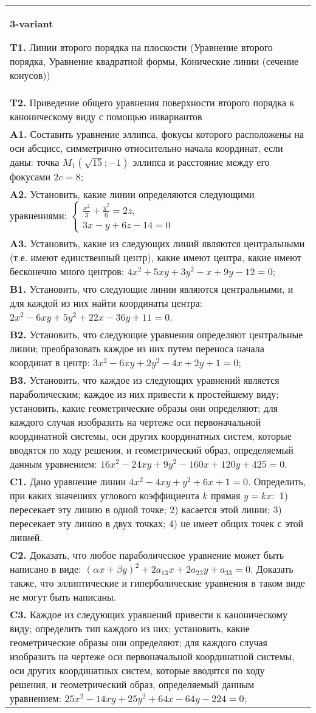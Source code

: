 \documentclass{article}
\begin{document}
\begin{tabular}{m{17cm}}
\textbf{3-variant}
\newline

\textbf{T1.} Линии второго порядка на плоскости (Уравнение второго порядка, Уравнение квадратной формы, Конические линии (сечение конусов)) \\
\textbf{T2.} Приведение общего уравнения поверхности второго порядка к каноническому виду с помощью инвариантов \\
\textbf{A1.} Составить уравнение эллипса, фокусы которого расположены на оси абсцисс, симметрично относительно начала координат, если даны: точка $M_1(\sqrt{15} ;-1)$ эллипса и расстояние между его фокусами $2 c=8$; \\
\textbf{A2.} Установить, какие линии определяются следующими уравнениями: $\left\{\begin{array}{l}\frac{x^2}{3}+\frac{y^2}{6}=2 z, \\ 3 x-y+6 z-14=0\end{array}\right.$ \\
\textbf{A3.} Установить, какие из следующих линий являются центральными (т.е. имеют единственный центр), какие имеют центра, какие имеют бесконечно много центров: $4 x^2+5 x y+3 y^2-x+9 y-12=0$; \\
\textbf{B1.} Установить, что следующие линии являются центральными, и для каждой из них найти координаты центра: $2 x^2-6 x y+5 y^2+22 x-36 y+11=0$. \\
\textbf{B2.} Установить, что следующие уравнения определяют центральные линии; преобразовать каждое из них путем переноса начала координат в центр: $3 x^2-6 x y+2 y^2-4 x+2 y+1=0$; \\
\textbf{B3.} Установить, что каждое из следующих уравнений является параболическим; каждое из них привести к простейшему виду; установить, какие геометрические образы они определяют; для каждого случая изобразить на чертеже оси первоначальной координатной системы, оси других координатных систем, которые вводятся по ходу решения, и геометрический образ, определяемый данным уравнением: $16 x^2-24 x y+9 y^2-160 x+120 y+425=0$. \\
\textbf{C1.} Дано уравнение линии $4 x^2-4 x y+y^2+6 x+1=0$. Определить, при каких значениях углового коэффициента $k$ прямая $y=k x:$ 1) пересекает эту линию в одной точке; 2) касается этой линии; 3) пересекает эту линию в двух точках; 4) не имеет общих точек с этой линией. \\
\textbf{C2.} Доказать, что любое параболическое уравнение может быть написано в виде: $ (\alpha x+\beta y) ^2+2a_{13}x+2a_{23}y+a_{33}=0$. Доказать также, что эллиптические и гиперболические уравнения в таком виде не могут быть написаны. \\
\textbf{C3.} Каждое из следующих уравнений привести к каноническому виду; определить тип каждого из них; установить, какие геометрические образы они определяют; для каждого случая изобразить на чертеже оси первоначальной координатной системы, оси других координатных систем, которые вводятся по ходу решения, и геометрический образ, определяемый данным уравнением: $25 x^2-14 x y+25 y^2+64 x-64 y-224=0$; \\

\end{tabular}
\end{document}
